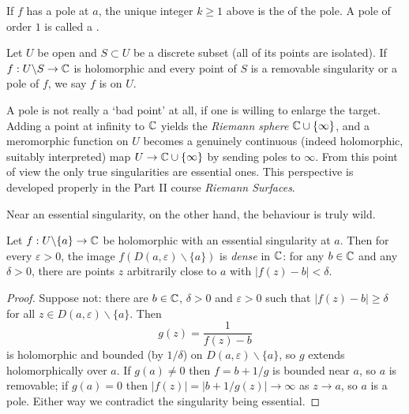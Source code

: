 \documentclass[a4paper]{scrartcl}
\begin{document}
\begin{definition}
    If $f$ has a pole at $a$, the unique integer $k \geq 1$ above is the  of the pole. A pole of order $1$ is called a .
\end{definition}

\begin{definition}[Meromorphic]
    Let $U$ be open and $S \subset U$ be a discrete subset (all of its points are isolated). If $f: U \backslash S \rightarrow \mathbb{C}$ is holomorphic and every point of $S$ is a removable singularity or a pole of $f$, we say $f$ is  on $U$.
\end{definition}

\begin{remark}
    A pole is not really a `bad point' at all, if one is willing to enlarge the target. Adding a point at infinity to $\mathbb{C}$ yields the \emph{Riemann sphere} $\mathbb{C} \cup \{\infty\}$, and a meromorphic function on $U$ becomes a genuinely continuous (indeed holomorphic, suitably interpreted) map $U \rightarrow \mathbb{C} \cup \{\infty\}$ by sending poles to $\infty$. From this point of view the only true singularities are essential ones. This perspective is developed properly in the Part II course \emph{Riemann Surfaces}.
\end{remark}

Near an essential singularity, on the other hand, the behaviour is truly wild.

\begin{theorem}
    Let $f: U \backslash \{a\} \rightarrow \mathbb{C}$ be holomorphic with an essential singularity at $a$. Then for every $\varepsilon > 0$, the image $f(D(a, \varepsilon) \backslash \{a\})$ is \emph{dense} in $\mathbb{C}$: for any $b \in \mathbb{C}$ and any $\delta > 0$, there are points $z$ arbitrarily close to $a$ with $|f(z) - b| < \delta$.
\end{theorem}
\begin{proof}
    Suppose not: there are $b \in \mathbb{C}$, $\delta > 0$ and $\varepsilon > 0$ such that $|f(z) - b| \geq \delta$ for all $z \in D(a, \varepsilon)\backslash\{a\}$. Then
    $$
    g(z) = \frac{1}{f(z) - b}
    $$
    is holomorphic and bounded (by $1/\delta$) on $D(a, \varepsilon) \backslash \{a\}$, so $g$ extends holomorphically over $a$. If $g(a) \neq 0$ then $f = b + 1/g$ is bounded near $a$, so $a$ is removable; if $g(a) = 0$ then $|f(z)| = |b + 1/g(z)| \rightarrow \infty$ as $z \rightarrow a$, so $a$ is a pole. Either way we contradict the singularity being essential.
\end{proof}
\end{document}
